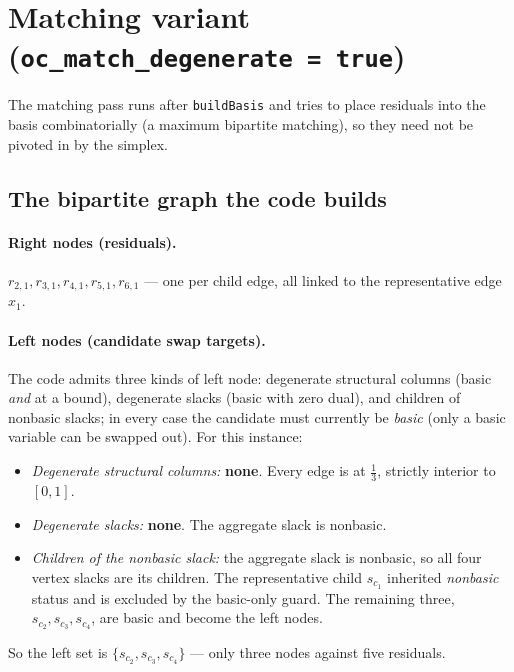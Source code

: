 \documentclass[11pt]{article}
\newcommand{\slack}[1]{s_{#1}}
\begin{document}
\section{Matching variant (\texttt{oc\_match\_degenerate = true})}

The matching pass runs after \texttt{buildBasis} and tries to place residuals
into the basis combinatorially (a maximum bipartite matching), so they need not
be pivoted in by the simplex.

\subsection*{The bipartite graph the code builds}

\paragraph{Right nodes (residuals).}
$r_{2,1},r_{3,1},r_{4,1},r_{5,1},r_{6,1}$ --- one per child edge, all linked to
the representative edge $x_1$.

\paragraph{Left nodes (candidate swap targets).}
The code admits three kinds of left node: degenerate structural columns (basic
\emph{and} at a bound), degenerate slacks (basic with zero dual), and children of
nonbasic slacks; in every case the candidate must currently be \emph{basic}
(only a basic variable can be swapped out). For this instance:
\begin{itemize}[nosep]
  \item \emph{Degenerate structural columns:} \textbf{none}. Every edge is at
        $\tfrac13$, strictly interior to $[0,1]$.
  \item \emph{Degenerate slacks:} \textbf{none}. The aggregate slack is nonbasic.
  \item \emph{Children of the nonbasic slack:} the aggregate slack is nonbasic,
        so all four vertex slacks are its children. The representative child
        $\slack{c_1}$ inherited \emph{nonbasic} status and is excluded by the
        basic-only guard. The remaining three, $\slack{c_2},\slack{c_3},
        \slack{c_4}$, are basic and become the left nodes.
\end{itemize}
So the left set is $\{\slack{c_2},\slack{c_3},\slack{c_4}\}$ --- only three nodes
against five residuals.
\end{document}
